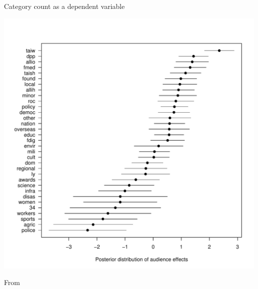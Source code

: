 \documentclass{hertieteaching}
\begin{document}
%
%
%
%
%
%
%
%
%
%
%
%
%
%
%
%

\begin{frame}{Category count as a dependent variable}
\protect\hypertarget{category-count-as-a-dependent-variable}{}

\centerline{\includegraphics[width=0.5\linewidth]{pictures/indep-ref} }

From \textcite{Sullivan.Lowe2010}


\end{frame}
\end{document}
